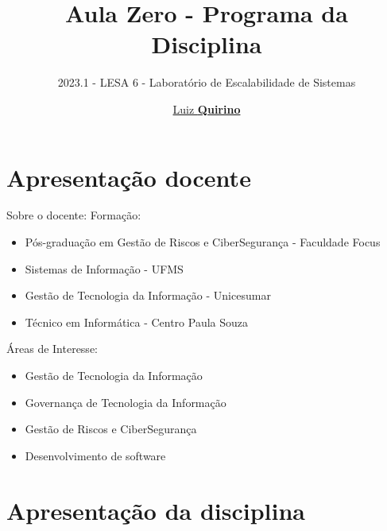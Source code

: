 \documentclass{beamer}
\title{Aula Zero - Programa da Disciplina}
\subtitle{2023.1 - LESA 6 -  Laboratório de Escalabilidade de Sistemas}
\author{\href{mailto:luiz.quirino@ifsp.edu.br}{Luiz \textbf{Quirino}}}
\newcommand{\hrefcol}[2]{\textcolor{cyan}{\href{#1}{#2}}}
\begin{document}
\maketitle

%
%


\section{Apresentação docente}

\begin{frame}{Sobre o docente:}
Formação:
\begin{itemize}
\item Pós-graduação em Gestão de Riscos e CiberSegurança - Faculdade Focus
\item Sistemas de Informação - UFMS
\item Gestão de Tecnologia da Informação - Unicesumar
\item Técnico em Informática - Centro Paula Souza
\end{itemize}
Áreas de Interesse:
\begin{itemize}
\item Gestão de Tecnologia da Informação
\item Governança de Tecnologia da Informação
\item Gestão de Riscos e CiberSegurança
\item Desenvolvimento de software
\end{itemize}
\end{frame}

\section{Apresentação da disciplina}
\end{document}
